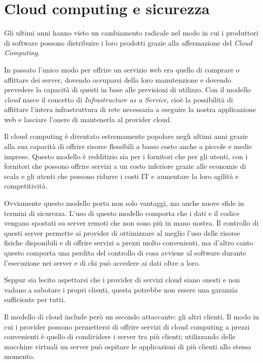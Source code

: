 \documentclass[12pt,italian]{report}
\begin{document}
\section{Cloud computing e sicurezza}
\label{sec:cloud}
Gli ultimi anni hanno visto un cambiamento radicale nel modo in cui
i produttori di software possono distribuire i loro prodotti
grazie alla affermazione del \textit{Cloud Computing}.

In passato l'unico modo per offrire un servizio web era quello di
comprare o affittare dei server, dovendo occuparsi della loro manutenzione
e dovendo prevedere la capacità di questi in base alle previsioni di
utilizzo.
Con il modello \textit{cloud} nasce il concetto di
\textit{Infrastructure as a Service}, cioè la possibilità di affittare
l'intera infrastruttura di rete necessaria a eseguire la nostra applicazione
web e lasciare l'onere di mantenerla al provider cloud.

Il cloud computing è diventato estremamente popolare negli ultimi anni
grazie alla sua capacità di offrire risorse flessibili a basso costo
anche a piccole e medie imprese.
Questo modello è redditizio sia per i fornitori che per gli utenti,
con i fornitori che possono offrire servizi a un costo inferiore grazie
alle economie di scala e gli utenti che possono ridurre i costi IT e
aumentare la loro agilità e competitività.

\bigbreak \noindent

Ovviamente questo modello porta non solo vantaggi, ma anche nuove sfide
in termini di sicurezza.
L'uso di questo modello comporta che i dati e il codice vengano spostati
su server remoti che non sono più in mano nostra.
Il controllo di questi server permette ai provider di ottimizzare al meglio
l'uso delle risorse fisiche disponibili e di offrire servizi a prezzi molto
convenienti, ma d'altro canto questo comporta una perdita del controllo
di cosa avviene al software durante l'esecuzione nei server e di 
chi può accedere ai dati oltre a loro.

Seppur sia lecito aspettarsi che i provider di servizi cloud siano onesti
e non vadano a sabotare i propri clienti, questa potrebbe non essere
una garanzia sufficiente per tutti.

Il modello di cloud include però un secondo attaccante: gli altri clienti.
Il modo in cui i provider possono permettersi di offrire servizi di cloud
computing a prezzi convenienti è quello di condividere i server tra più
clienti; utilizzando delle macchine virtuali un server
può ospitare le applicazioni di più clienti allo stesso momento.
\end{document}
